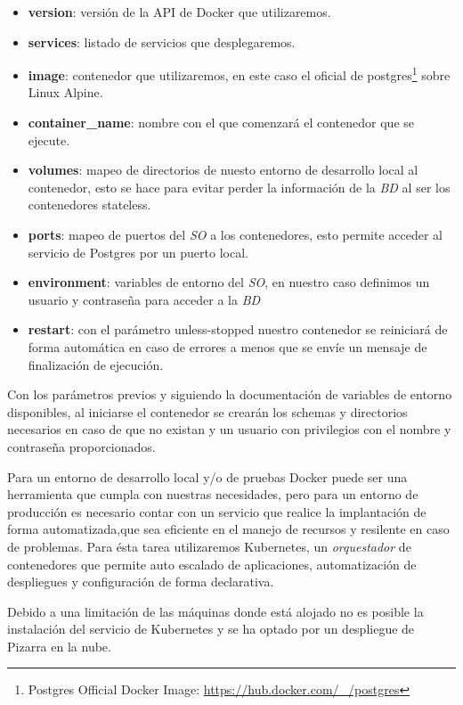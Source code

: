 \documentclass[11pt,spanish,listoffigures,listoftables]{tfgetsinf}
\begin{document}
\begin{itemize}
	\item \textbf{version}: versión de la API de Docker que utilizaremos.
	\item \textbf{services}: listado de servicios que desplegaremos.
	\item \textbf{image}: contenedor que utilizaremos, en este caso el oficial de postgres\footnote{Postgres Official Docker Image: \url{https://hub.docker.com/_/postgres}} sobre Linux Alpine.
	\item \textbf{container\_name}: nombre con el que comenzará el contenedor que se ejecute.
	\item \textbf{volumes}: mapeo de directorios de nuesto entorno de desarrollo local al contenedor, esto se hace para evitar perder la información de la \textit{BD} al ser los contenedores \foreignlanguage{english}{stateless}.
    \item \textbf{ports}: mapeo de puertos del \textit{SO} a los contenedores, esto permite acceder al servicio de Postgres por un puerto local.
	\item \textbf{environment}: variables de entorno del \textit{SO}, en nuestro caso definimos un usuario y contraseña para acceder a la \textit{BD}
	\item \textbf{restart}: con el parámetro \foreignlanguage{english}{unless-stopped} nuestro contenedor se reiniciará de forma automática en caso de errores a menos que se envíe un mensaje de finalización de ejecución.
\end{itemize}

Con los parámetros previos y siguiendo la documentación de variables de entorno disponibles, al iniciarse el contenedor se crearán los \foreignlanguage{english}{schemas} y directorios necesarios en caso de que no existan y un usuario con privilegios con el nombre y contraseña proporcionados.

Para un entorno de desarrollo local y/o de pruebas Docker puede ser una herramienta que cumpla con nuestras necesidades, pero para un entorno de producción es necesario contar con un servicio que realice la implantación de forma automatizada,que sea eficiente en el manejo de recursos y resilente en caso de problemas. Para ésta tarea utilizaremos Kubernetes, un \textit{orquestador} de contenedores que permite auto escalado de aplicaciones, automatización de despliegues y configuración de forma declarativa.

Debido a una limitación de las máquinas donde está alojado \kahan no es posible la instalación del servicio de Kubernetes y se ha optado por un despliegue de Pizarra en la nube.
\end{document}
